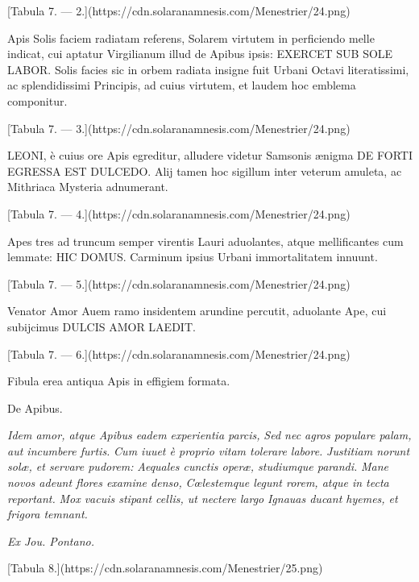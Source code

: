 \documentclass[a4paper, 11pt, oneside, polutonikogreek, latin]{article}
\begin{document}
[Tabula 7. --- 2.](https://cdn.solaranamnesis.com/Menestrier/24.png)

Apis Solis faciem radiatam referens, Solarem virtutem in perficiendo melle indicat, cui aptatur Virgilianum illud de Apibus ipsis: EXERCET SUB SOLE LABOR. Solis facies sic in orbem radiata insigne fuit Urbani Octavi literatissimi, ac splendidissimi Principis, ad cuius virtutem, et laudem hoc emblema componitur.

[Tabula 7. --- 3.](https://cdn.solaranamnesis.com/Menestrier/24.png)

LEONI, è cuius ore Apis egreditur, alludere videtur Samsonis ænigma DE FORTI EGRESSA EST DULCEDO. Alij tamen hoc sigillum inter veterum amuleta, ac Mithriaca Mysteria adnumerant.

[Tabula 7. --- 4.](https://cdn.solaranamnesis.com/Menestrier/24.png)

Apes tres ad truncum semper virentis Lauri aduolantes, atque mellificantes cum lemmate: HIC DOMUS. Carminum ipsius Urbani immortalitatem innuunt.

[Tabula 7. --- 5.](https://cdn.solaranamnesis.com/Menestrier/24.png)

Venator Amor Auem ramo insidentem arundine percutit, aduolante Ape, cui subijcimus DULCIS AMOR LAEDIT.

[Tabula 7. --- 6.](https://cdn.solaranamnesis.com/Menestrier/24.png)

Fibula erea antiqua Apis in effigiem formata.

De Apibus.

\emph{Idem amor, atque Apibus eadem experientia parcis,}
\emph{Sed nec agros populare palam, aut incumbere furtis.}
\emph{Cum iuuet è proprio vitam tolerare labore.}
\emph{Justitiam norunt solæ, et servare pudorem:}
\emph{Aequales cunctis operæ, studiumque parandi.}
\emph{Mane novos adeunt flores examine denso,}
\emph{Cœlestemque legunt rorem, atque in tecta reportant.}
\emph{Mox vacuis stipant cellis, ut nectere largo}
\emph{Ignauas ducant hyemes, et frigora temnant.}

\emph{Ex Jou. Pontano.}

[Tabula 8.](https://cdn.solaranamnesis.com/Menestrier/25.png)
\end{document}
